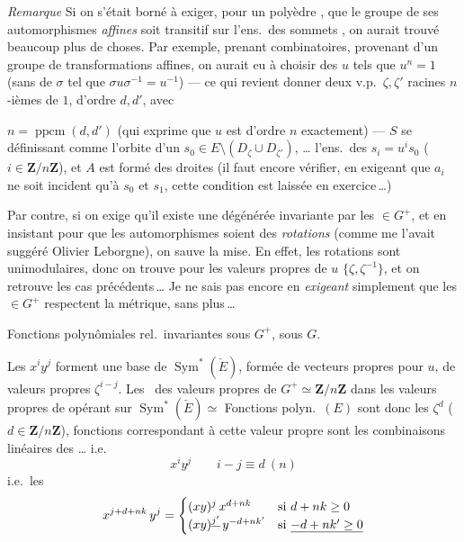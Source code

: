 \documentclass[11pt,a4paper]{article}
\begin{document}
\emph{Remarque} Si on s'était borné à exiger, pour un polyèdre   , que le groupe de ses automorphismes \emph{affines} soit transitif sur l'ens.\ des sommets , on aurait trouvé beaucoup plus de choses. Par exemple, prenant   combinatoires, provenant d'un groupe de transformations affines, on aurait eu à choisir des $u$ tels que $u^{n} = 1$ (sans   de $\sigma$ tel que $\sigma u \sigma^{-1} = u^{-1}$) — ce qui revient  donner deux v.p.\ $\zeta, \zeta'$ racines  $n$-ièmes de $1$, d'ordre $d, d'$, avec

$n = \operatorname{ppcm}(d, d')$ (qui exprime que $u$ est d'ordre $n$ exactement) — $S$ se définissant comme l'orbite d'un $s_0 \in E \setminus (D_\zeta \cup D_{\zeta'})$,  \ldots{} l'ens.\ des $s_i = u^{i} s_0$  ($i \in \mathbf{Z}/n\mathbf{Z}$), et $A$ est formé des droites  (il faut encore vérifier, en exigeant que $a_i$ ne soit incident qu'à $s_0$ et $s_1$, cette condition est laissée en exercice\,…)

Par contre, si on exige  qu'il existe une  \add{$\delta$}  dégénérée invariante par les \struck{$\delta$} $\in G^{+}$, et en insistant pour que les automorphismes soient  des \emph{rotations} (comme me l'avait suggéré Olivier Leborgne), on sauve la mise. En effet, les rotations sont unimodulaires, donc on trouve pour les valeurs propres de $u$  $\{\zeta, \zeta^{-1}\}$, et on retrouve les cas précédents\,… Je ne sais pas   \uncertain{\ill{}} encore en \emph{exigeant} simplement que les $\in G^{+}$ respectent la métrique, sans plus\,…

Fonctions polynômiales rel.\ invariantes sous $G^{+}$, sous $G$.

\struck{\ill{}} Les $x^{i}y^{j}$ forment une base de $\operatorname{Sym}^{*}(\check{E})$, formée de vecteurs propres pour $u$, de valeurs propres $\zeta^{i-j}$. \struck{\ill{}} Les \ des valeurs propres de $G^{+} \simeq \mathbf{Z}/n\mathbf{Z}$ dans les valeurs propres de  opérant sur $\operatorname{Sym}^{*}(\check{E}) \simeq$ Fonctions polyn.\ $(E)$ sont donc les $\zeta^{d}$ ($d \in \mathbf{Z}/n\mathbf{Z}$),  fonctions correspondant à cette valeur propre sont les combinaisons linéaires des  \ldots{} i.e.
\[
x^{i}y^{j} \qquad i - j \equiv d \ (n)
\]
i.e.\ les
\[
x^{j+d+nk}\,y^{j} =
\begin{cases}
(xy)^{j}\, x^{d+nk} & \text{si } d + nk \geq 0 \\
(xy)^{\uncertain{j'}}\, y^{-d+nk'} & \text{si } \uncertain{-d+nk' \geq 0}
\end{cases}
\]
\end{document}
